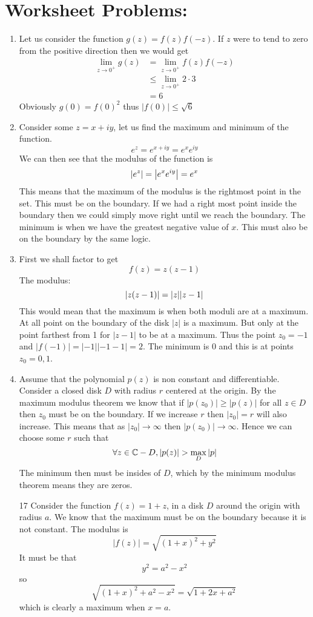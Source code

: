 \documentclass{article}
\begin{document}
  \section{Worksheet Problems:}
  \begin{enumerate}
    \item
      Let us consider the function $g(z)=f(z)f(-z)$. If $z$ were to tend to zero from the positive direction then we would get
      \begin{align*}
        \lim_{z\to0^+}g(z)&=\lim_{z\to0^+}f(z)f(-z)\\
        &\leq\lim_{z\to0^+}2\cdot3\\
        &=6
      \end{align*}
      Obviously $g(0)=f(0)^2$ thus $|f(0)|\leq\sqrt{6}$
    \item
      Consider some $z=x+iy$, let us find the maximum and minimum of the function.
      \[e^z=e^{x+iy}=e^xe^{iy}\]
      We can then see that the modulus of the function is
      \[\left|e^z\right|=\abs*{e^xe^{iy}}=e^x\]
      This means that the maximum of the modulus is the rightmost point in the set. This must be on the boundary. If we had a right most point inside the boundary then we could simply move right until we reach the boundary. The minimum is when we have the greatest negative value of $x$. This must also be on the boundary by the same logic.
    \item
      First we shall factor to get
      \[f(z)=z(z-1)\]
      The modulus:
      \[\abs*{z(z-1)}=\abs{z}\abs{z-1}\]
      This would mean that the maximum is when both moduli are at a maximum. At all point on the boundary of the disk $|z|$ is a maximum. But only at the point farthest from 1 for $|z-1|$ to be at a maximum. Thus the point $z_0=-1$ and $|f(-1)|=|-1||-1-1|=2$. The minimum is 0 and this is at points $z_0=0,1$.
    \item
      Assume that the polynomial $p(z)$ is non constant and differentiable. Consider a closed disk $D$ with radius $r$ centered at the origin. By the maximum modulus theorem we know that if $|p(z_0)|\geq|p(z)|$ for all $z\in D$ then $z_0$ must be on the boundary. If we increase $r$ then $|z_0|=r$ will also increase. This means that as $|z_0|\to\infty$ then $|p(z_0)|\to\infty$. Hence we can choose some $r$ such that
      \[\forall z\in\C-D,|p(z)|>\max_D|p|\]
      The minimum then must be insides of $D$, which by the minimum modulus theorem means they are zeros.
    \item[17]
      Consider the function $f(z)=1+z$, in a disk $D$ around the origin with radius $a$. We know that the maximum must be on the boundary because it is not constant. The modulus is
      \[|f(z)|=\sqrt{(1+x)^2+y^2}\]
      It must be that
      \[y^2=a^2-x^2\]
      so
      \[\sqrt{(1+x)^2+a^2-x^2}=\sqrt{1+2x+a^2}\]
      which is clearly a maximum when $x=a$.
  \end{enumerate}
\end{document}
